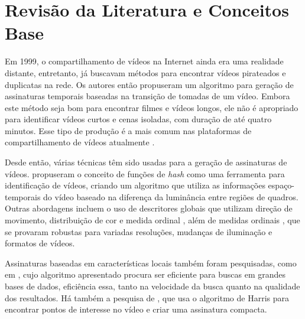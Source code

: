 

\chapter{Revisão da Literatura e Conceitos Base}
\label{chap:revisao}




Em 1999, o compartilhamento de vídeos na Internet ainda era uma realidade distante, entretanto,  já buscavam métodos para encontrar vídeos pirateados e duplicatas na rede. Os autores então propuseram um algoritmo para geração de assinaturas temporais baseadas na transição de tomadas de um vídeo. Embora este método seja bom para encontrar filmes e vídeos longos, ele não é apropriado para identificar vídeos curtos e cenas isoladas, com duração de até quatro minutos. Esse tipo de produção é a mais comum nas plataformas de compartilhamento de vídeos atualmente \cite{comscoreinc}.

Desde então, várias técnicas têm sido usadas para a geração de assinaturas de vídeos.  propuseram o conceito de funções de \textit{hash} como uma ferramenta para identificação de vídeos, criando um algoritmo que utiliza as informações espaço-temporais do vídeo baseado na diferença da luminância entre regiões de quadros. Outras abordagens incluem o uso de descritores globais que utilizam direção de movimento, distribuição de cor e medida ordinal \cite{hampapur2001comparison}, além de medidas ordinais \cite{hua2004robust}, que se provaram robustas para variadas resoluções, mudanças de iluminação e formatos de vídeos.	   	

Assinaturas baseadas em características locais também foram pesquisadas, como em \cite{joly2007content}, cujo algoritmo apresentado procura ser eficiente para buscas em grandes bases de dados, eficiência essa, tanto na velocidade da busca quanto na qualidade dos resultados. Há também a  pesquisa de , que usa o algoritmo de Harris para encontrar pontos de interesse no vídeo e criar uma assinatura compacta.

